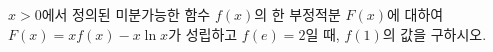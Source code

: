 $x>0$에서 정의된 미분가능한 함수 $f(x)$의 한 부정적분 $F(x)$에 대하여 $F(x)=xf(x)-x\ln x$가 성립하고 $f(e)=2$일 때, $f(1)$의 값을 구하시오.

